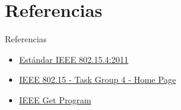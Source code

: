 \documentclass[aspectratio=169]{beamer}
\begin{document}
%
%
%
%


\section{Referencias}

\begin{frame}[t]{Referencias}
\begin{itemize}
	\item \href{http://ecee.colorado.edu/~liue/teaching/comm_standards/2015S_zigbee/802.15.4-2011.pdf}{Estándar IEEE 802.15.4:2011}
	\item \href{http://www.ieee802.org/15/pub/TG4.html}{IEEE 802.15 - Task Group 4 - Home Page}
	\item \href{	https://standards.ieee.org/about/get/802/802.15.html}{IEEE Get Program}
\end{itemize}
\end{frame}

\end{document}
